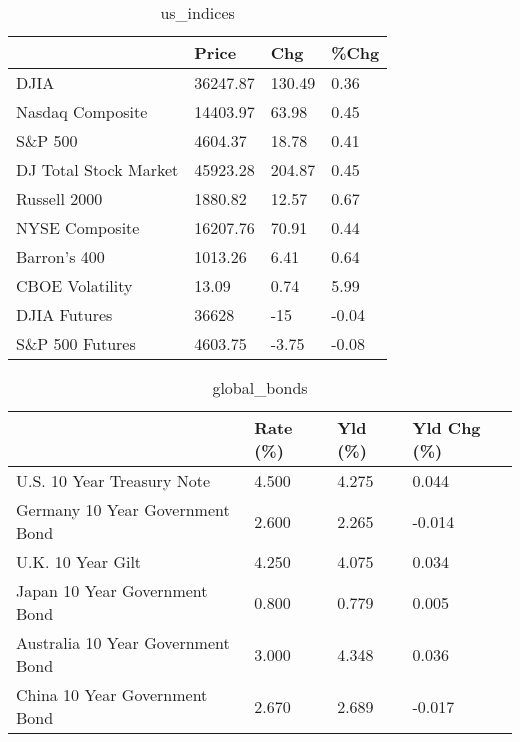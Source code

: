 \documentclass{article}%
\begin{document}
%


\begin{table}[htbp]%
\caption{us\_indices}%
\centering%
\begin{adjustbox}{width=1\textwidth}%
\begin{tabular}{llll}
\toprule
                      &    Price &    Chg &  \%Chg \\
\midrule
                 DJIA & 36247.87 & 130.49 &  0.36 \\
     Nasdaq Composite & 14403.97 &  63.98 &  0.45 \\
              S\&P 500 &  4604.37 &  18.78 &  0.41 \\
DJ Total Stock Market & 45923.28 & 204.87 &  0.45 \\
         Russell 2000 &  1880.82 &  12.57 &  0.67 \\
       NYSE Composite & 16207.76 &  70.91 &  0.44 \\
         Barron's 400 &  1013.26 &   6.41 &  0.64 \\
      CBOE Volatility &    13.09 &   0.74 &  5.99 \\
         DJIA Futures &    36628 &    -15 & -0.04 \\
      S\&P 500 Futures &  4603.75 &  -3.75 & -0.08 \\
\bottomrule
\end{tabular}
%
\end{adjustbox}%
\end{table}

%


\begin{table}[htbp]%
\caption{global\_bonds}%
\centering%
\begin{adjustbox}{width=1\textwidth}%
\begin{tabular}{llll}
\toprule
                                  & Rate (\%) & Yld (\%) & Yld Chg (\%) \\
\midrule
       U.S. 10 Year Treasury Note &    4.500 &   4.275 &       0.044 \\
  Germany 10 Year Government Bond &    2.600 &   2.265 &      -0.014 \\
                U.K. 10 Year Gilt &    4.250 &   4.075 &       0.034 \\
    Japan 10 Year Government Bond &    0.800 &   0.779 &       0.005 \\
Australia 10 Year Government Bond &    3.000 &   4.348 &       0.036 \\
    China 10 Year Government Bond &    2.670 &   2.689 &      -0.017 \\
\bottomrule
\end{tabular}
%
\end{adjustbox}%
\end{table}
\end{document}
